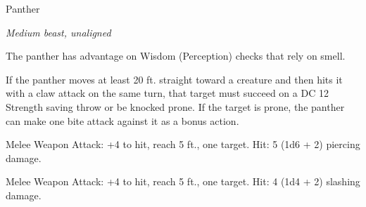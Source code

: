 \begin{monsterbox}{Panther}
\begin{hangingpar}
\textit{Medium beast, unaligned}
\end{hangingpar}
\dndline%
\basics[%
armorclass = 12,
hitpoints = 3d8,
speed = {50 ft., climb 40 ft.}
]
\dndline%
\stats[%
STR = \stat{14},
DEX = \stat{15},
CON = \stat{10},
INT = \stat{3},
WIS = \stat{14},
CHA = \stat{7}
]
\dndline%
\details[%
skills={Stealth +6, Perception +4, },
damageimmunities={},
savingthrows={},
conditionimmunities={},
damageresistances={},
damagevulnerabilities={},
senses={passive Perception 14},
challenge=1/4
]
\dndline%
\begin{monsteraction}
The panther has advantage on Wisdom (Perception) checks that rely on smell.
\end{monsteraction}
\begin{monsteraction}[Pounce]
If the panther moves at least 20 ft. straight toward a creature and then hits it with a claw attack on the same turn, that target must succeed on a DC 12 Strength saving throw or be knocked prone. If the target is prone, the panther can make one bite attack against it as a bonus action.
\end{monsteraction}
\begin{monsteraction}[Bite]
Melee Weapon Attack: +4 to hit, reach 5 ft., one target. Hit: 5 (1d6 + 2) piercing damage.
\end{monsteraction}
\begin{monsteraction}[Claw]
Melee Weapon Attack: +4 to hit, reach 5 ft., one target. Hit: 4 (1d4 + 2) slashing damage.
\end{monsteraction}
\end{monsterbox}